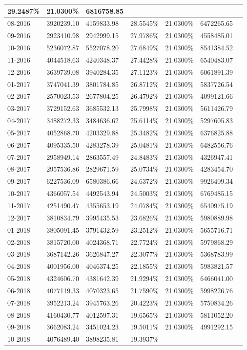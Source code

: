 \documentclass{report}
\begin{document}
\begin{longtable}[c]{|p{1.7cm}|p{2.6cm}|p{2.6cm}|p{2.3cm}|p{2.3cm}|p{2.3cm}|c|}
29.2487\% & 21.0300\% & 6816758.85\\ \hline08-2016 & 3920239.10 & 4159833.98 & 28.5545\% & 21.0300\% & 6472265.65\\ \hline09-2016 & 2923410.98 & 2942999.15 & 27.9786\% & 21.0300\% & 4558485.01\\ \hline10-2016 & 5236072.87 & 5527078.20 & 27.6849\% & 21.0300\% & 8541384.52\\ \hline11-2016 & 4044518.63 & 4240348.37 & 27.4428\% & 21.0300\% & 6540483.07\\ \hline12-2016 & 3639739.08 & 3940284.35 & 27.1123\% & 21.0300\% & 6061891.39\\ \hline01-2017 & 3747041.39 & 3801784.85 & 26.8712\% & 21.0300\% & 5837726.54\\ \hline02-2017 & 2570023.53 & 2677804.25 & 26.4792\% & 21.0300\% & 4099121.66\\ \hline03-2017 & 3729152.63 & 3685532.13 & 25.7998\% & 21.0300\% & 5611426.79\\ \hline04-2017 & 3488272.33 & 3484636.62 & 25.6114\% & 21.0300\% & 5297605.83\\ \hline05-2017 & 4052868.70 & 4203329.88 & 25.3482\% & 21.0300\% & 6376825.88\\ \hline06-2017 & 4095335.50 & 4283278.39 & 25.0481\% & 21.0300\% & 6482556.76\\ \hline07-2017 & 2958949.14 & 2863557.49 & 24.8483\% & 21.0300\% & 4326947.41\\ \hline08-2017 & 2957536.86 & 2829671.59 & 25.0734\% & 21.0300\% & 4283454.70\\ \hline09-2017 & 6227536.09 & 6580386.66 & 24.6372\% & 21.0300\% & 9926409.34\\ \hline10-2017 & 4366057.54 & 4492543.94 & 24.5003\% & 21.0300\% & 6769485.15\\ \hline11-2017 & 4251490.47 & 4355653.19 & 24.0784\% & 21.0300\% & 6540975.19\\ \hline12-2017 & 3810834.79 & 3995435.53 & 23.6826\% & 21.0300\% & 5980889.98\\ \hline01-2018 & 3805091.45 & 3791432.59 & 23.2512\% & 21.0300\% & 5655716.71\\ \hline02-2018 & 3815720.00 & 4024368.71 & 22.7724\% & 21.0300\% & 5979868.29\\ \hline03-2018 & 3687142.26 & 3626847.27 & 22.3077\% & 21.0300\% & 5368783.99\\ \hline04-2018 & 4001956.00 & 4046374.25 & 22.1855\% & 21.0300\% & 5983821.57\\ \hline05-2018 & 4324606.70 & 4381642.39 & 21.9294\% & 21.0300\% & 6466041.00\\ \hline06-2018 & 4077119.33 & 4070323.65 & 21.7590\% & 21.0300\% & 5998226.76\\ \hline07-2018 & 3952213.24 & 3945763.26 & 20.4223\% & 21.0300\% & 5750834.26\\ \hline08-2018 & 4160430.77 & 4012597.31 & 19.6565\% & 21.0300\% & 5811052.20\\ \hline09-2018 & 3662083.24 & 3451024.23 & 19.5011\% & 21.0300\% & 4991292.15\\ \hline10-2018 & 4076489.40 & 3898235.81 & 19.3937\% 
\end{longtable}
\end{document}

